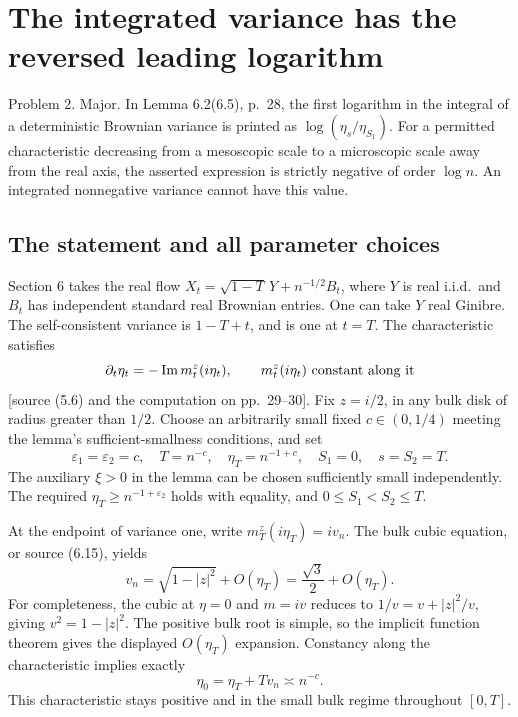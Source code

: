 \documentclass[10pt]{article}
\begin{document}
\section*{The integrated variance has the reversed leading logarithm}
Problem 2.  Major. In Lemma 6.2(6.5), p. 28, the first logarithm in the integral of a deterministic Brownian variance is printed as \(\log(\eta_s/\eta_{S_1})\). For a permitted characteristic decreasing from a mesoscopic scale to a microscopic scale away from the real axis, the asserted expression is strictly negative of order \(\log n\). An integrated nonnegative variance cannot have this value.\par
\subsection*{The statement and all parameter choices}
Section 6 takes the real flow \(X_t=\sqrt{1-T}\,Y+n^{-1/2}B_t\), where \(Y\) is real i.i.d. and \(B_t\) has independent standard real Brownian entries. One can take \(Y\) real Ginibre. The self-consistent variance is \(1-T+t\), and is one at \(t=T\). The characteristic satisfies \[\partial_t\eta_t=-\operatorname{Im}m_t^z(i\eta_t),
 \qquad m_t^z(i\eta_t)\ \hbox{constant along it}\] [source (5.6) and the computation on pp. 29–30]. Fix \(z=i/2\), in any bulk disk of radius greater than \(1/2\). Choose an arbitrarily small fixed \(c\in(0,1/4)\) meeting the lemma’s sufficient-smallness conditions, and set \[\varepsilon_1=\varepsilon_2=c,\quad T=n^{-c},\quad
 \eta_T=n^{-1+c},\quad S_1=0,\quad s=S_2=T.\] The auxiliary \(\xi>0\) in the lemma can be chosen sufficiently small independently. The required \(\eta_T\ge n^{-1+\varepsilon_2}\) holds with equality, and \(0\le S_1<S_2\le T\).\par
At the endpoint of variance one, write \(m_T^z(i\eta_T)=iv_n\). The bulk cubic equation, or source (6.15), yields \[v_n=\sqrt{1-|z|^2}+O(\eta_T)
     =\frac{\sqrt3}{2}+O(\eta_T).\] For completeness, the cubic at \(\eta=0\) and \(m=iv\) reduces to \(1/v=v+|z|^2/v\), giving \(v^2=1-|z|^2\). The positive bulk root is simple, so the implicit function theorem gives the displayed \(O(\eta_T)\) expansion. Constancy along the characteristic implies exactly \[\eta_0=\eta_T+Tv_n\asymp n^{-c}.\] This characteristic stays positive and in the small bulk regime throughout \([0,T]\).\par
\end{document}

